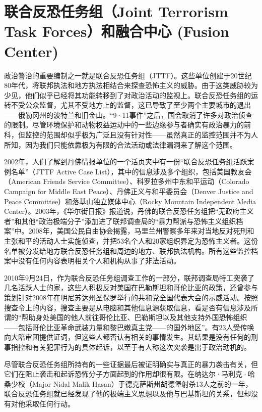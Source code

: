 \documentclass[fontset=fandol, a4paper, 12pt, openright]{ctexbook}
\begin{document}
\section{联合反恐任务组（Joint Terrorism Task Forces）和融合中心 (Fusion Center)}

政治警治的重要编制之一就是联合反恐任务组（JTTF）。这些单位创建于20世纪80年代，将联邦执法和地方执法相结合来探查恐怖主义的威胁。由于这类威胁较为少见，他们似乎已经将其功能转移到了对政治活动的监视上。联合反恐任务组的运转不受公众监督，尤其不受地方上的监督，这已导致了至少两个主要城市的退出——俄勒冈州的波特兰和旧金山。“9·11事件”之后，国会取消了许多对政治侦查的限制。尽管环境保护和动物权益运动中的一些边缘参与者确实有政治暴力的前科，但监控的范围却似乎极为广泛且没有针对性——虽然真正的监控范围并不为人所知，因为我们只能依靠极为有限的合法活动或法律漏洞来了解这个范围。

2002年，人们了解到丹佛情报单位的一个活页夹中有一份“联合反恐任务组活跃案例名单”（JTTF Active Case List），其中的信息涉及多个组织，包括美国教友会（American Friends Service Committee）、科罗拉多州中东和平运动（Colorado Campaign for Middle East Peace）、丹佛正义与和平委员会（Denver Justice and Peace Committee）和落基山独立媒体中心（Rocky Mountain Independent Media Center）。2003年，《华尔街日报》报道说，丹佛的联合反恐任务组把“无政府主义者”和其他“政治极端分子”添加进了联邦调查局的“暴力帮派与恐怖主义组织档案”中。2008年，美国公民自由协会揭露，马里兰州警察多年来对当地反对死刑和主张和平的活动人士实施侦查，并把53名个人和20家组织界定为恐怖主义者。这份名单被分发给地方联合反恐任务组和周边的地方、联邦执法机构。所有这些监控档案中没有任何内容表明相关个人和机构从事了非法活动。

2010年9月24日，作为联合反恐任务组调查工作的一部分，联邦调查局特工突袭了几名活跃人士的家，这些人积极反对美国在巴勒斯坦和哥伦比亚的政策，还曾参与策划针对2008年在明尼苏达州圣保罗举行的共和党全国代表大会的示威活动。按照搜查令上的内容，搜查主要是从电脑和其他信息源获取信息，看是否有信息涉及所谓的“帮助身处美国的他人前往哥伦比亚、巴勒斯坦以及其他支持外国恐怖组织——包括哥伦比亚革命武装力量和黎巴嫩真主党——的国外地区”。有23人受传唤向大陪审团提供证词，但这些人都否认有相关的事情发生。其结果是没有任何的刑事指控和有关犯罪行为的具体起诉，以至于有人称这次突袭是出于政治动机的。

尽管联合反恐任务组所持有的一些证据最后被证明确实与真正的暴力袭击有关，但它们在阻止袭击和起诉恐怖分子方面起到的作用却很有限。在纳达尔·马利克·哈桑少校（Major Nidal Malik Hasan）于德克萨斯州胡德堡射杀13人之前的一年，联合反恐任务组就已经发现了他的极端主义思想以及他与巴基斯坦的关系，但却没有对他采取任何行动。
\end{document}
